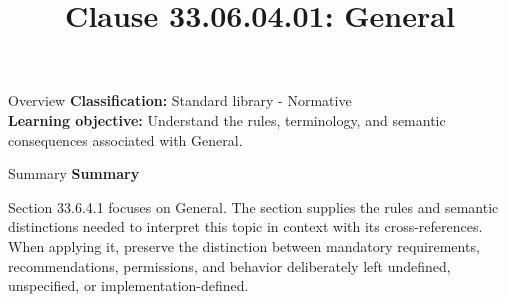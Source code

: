 \documentclass[10pt,letterpaper]{article}
\title{Clause 33.06.04.01: General}
\author{}
\date{}
\begin{document}
\maketitle
\begin{CornellOverviewBox}{Overview}
\textbf{Classification:} Standard library - Normative\\[2pt]
\textbf{Learning objective:} Understand the rules, terminology, and semantic consequences associated with General.
\end{CornellOverviewBox}\begin{CornellSummaryBox}{Summary}
{\sffamily\bfseries\color{Accent} Summary}\par\vspace{3pt}Section 33.6.4.1 focuses on General. The section supplies the rules and semantic distinctions needed to interpret this topic in context with its cross-references. When applying it, preserve the distinction between mandatory requirements, recommendations, permissions, and behavior deliberately left undefined, unspecified, or implementation-defined.
\end{CornellSummaryBox}
\end{document}

